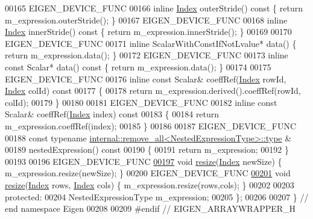 \begin{DoxyCode}
00165     EIGEN\_DEVICE\_FUNC
00166     \textcolor{keyword}{inline} \hyperlink{namespace_eigen_a62e77e0933482dafde8fe197d9a2cfde}{Index} outerStride()\textcolor{keyword}{ const }\{ \textcolor{keywordflow}{return} m\_expression.outerStride(); \}
00167     EIGEN\_DEVICE\_FUNC
00168     \textcolor{keyword}{inline} \hyperlink{namespace_eigen_a62e77e0933482dafde8fe197d9a2cfde}{Index} innerStride()\textcolor{keyword}{ const }\{ \textcolor{keywordflow}{return} m\_expression.innerStride(); \}
00169 
00170     EIGEN\_DEVICE\_FUNC
00171     \textcolor{keyword}{inline} ScalarWithConstIfNotLvalue* data() \{ \textcolor{keywordflow}{return} m\_expression.data(); \}
00172     EIGEN\_DEVICE\_FUNC
00173     \textcolor{keyword}{inline} \textcolor{keyword}{const} Scalar* data()\textcolor{keyword}{ const }\{ \textcolor{keywordflow}{return} m\_expression.data(); \}
00174 
00175     EIGEN\_DEVICE\_FUNC
00176     \textcolor{keyword}{inline} \textcolor{keyword}{const} Scalar& coeffRef(\hyperlink{namespace_eigen_a62e77e0933482dafde8fe197d9a2cfde}{Index} rowId, \hyperlink{namespace_eigen_a62e77e0933482dafde8fe197d9a2cfde}{Index} colId)\textcolor{keyword}{ const}
00177 \textcolor{keyword}{    }\{
00178       \textcolor{keywordflow}{return} m\_expression.derived().coeffRef(rowId, colId);
00179     \}
00180 
00181     EIGEN\_DEVICE\_FUNC
00182     \textcolor{keyword}{inline} \textcolor{keyword}{const} Scalar& coeffRef(\hyperlink{namespace_eigen_a62e77e0933482dafde8fe197d9a2cfde}{Index} index)\textcolor{keyword}{ const}
00183 \textcolor{keyword}{    }\{
00184       \textcolor{keywordflow}{return} m\_expression.coeffRef(index);
00185     \}
00186 
00187     EIGEN\_DEVICE\_FUNC
00188     \textcolor{keyword}{const} \textcolor{keyword}{typename} \hyperlink{group___sparse_core___module}{internal::remove\_all<NestedExpressionType>::type}
      & 
00189     nestedExpression()\textcolor{keyword}{ const }
00190 \textcolor{keyword}{    }\{
00191       \textcolor{keywordflow}{return} m\_expression;
00192     \}
00193 
00196     EIGEN\_DEVICE\_FUNC
\hyperlink{group___core___module_a0244fd1071715e2b0cd60e39c1e6e56a}{00197}     \textcolor{keywordtype}{void} \hyperlink{group___core___module_a0244fd1071715e2b0cd60e39c1e6e56a}{resize}(\hyperlink{namespace_eigen_a62e77e0933482dafde8fe197d9a2cfde}{Index} newSize) \{ m\_expression.resize(newSize); \}
00200     EIGEN\_DEVICE\_FUNC
\hyperlink{group___core___module_a6b0c3c352ad14c57294b022237b7489f}{00201}     \textcolor{keywordtype}{void} \hyperlink{group___core___module_a6b0c3c352ad14c57294b022237b7489f}{resize}(\hyperlink{namespace_eigen_a62e77e0933482dafde8fe197d9a2cfde}{Index} rows, \hyperlink{namespace_eigen_a62e77e0933482dafde8fe197d9a2cfde}{Index} cols) \{ m\_expression.resize(rows,cols); \}
00202 
00203   \textcolor{keyword}{protected}:
00204     NestedExpressionType m\_expression;
00205 \};
00206 
00207 \} \textcolor{comment}{// end namespace Eigen}
00208 
00209 \textcolor{preprocessor}{#endif // EIGEN\_ARRAYWRAPPER\_H}
\end{DoxyCode}
